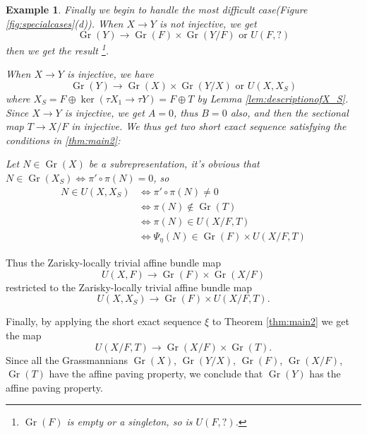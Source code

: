 \documentclass[reqno,11pt]{amsart}
\numberwithin{equation}{section}
\theoremstyle{plain}
\newtheorem{eg}[theorem]{Example}
\theoremstyle{plain}
\numberwithin{equation}{section}
\theoremstyle{remark}
\newcommand{\Gr}{\operatorname{Gr}}
\begin{document}
\begin{eg}
Finally we begin to handle the most difficult case(Figure \ref{fig:specialcases}(d)). When $X \longrightarrow Y$ is not injective, we get
$$\Gr(Y) \longrightarrow \Gr(F) \times \Gr(Y/F) \text{ or } U(F,?)$$
then we get the result \footnote{$\Gr(F)$ is empty or a singleton, so is $U(F,?)$.}.

When $X \longrightarrow Y$ is injective, we have
$$\Gr(Y) \longrightarrow \Gr(X) \times \Gr(Y/X) \text{ or } U(X,X_S)$$
where $X_S=F\oplus \ker(\tau X_1 \longrightarrow \tau Y)=F \oplus T$ by Lemma \ref{lem:descriptionofX_S}. Since $X \longrightarrow Y$ is injective, we get $A=0$, thus $B=0$ also, and then the sectional map $T \longrightarrow X/F$ in injective. We thus get two short exact sequence satisfying the conditions in \ref{thm:main2}:
\begin{center}
\end{center}
Let $N \in \Gr(X)$ be a subrepresentation, it's obvious that $N \in \Gr(X_S) \iff \pi'\circ \pi(N)=0$, so 
  \begin{equation*}
  \begin{aligned}
  N\in U(X,X_S) & \iff \pi'\circ \pi(N) \neq 0\\
  & \iff \pi(N) \notin \Gr(T)\\
  & \iff \pi(N) \in U(X/F,T)\\
  & \iff \Psi_{\eta}(N) \in \Gr(F) \times U(X/F,T)
  \end{aligned}
  \end{equation*}
\end{eg}
Thus the Zarisky-locally trivial affine bundle map
$$U(X,F) \longrightarrow \Gr(F) \times \Gr(X/F)$$
restricted to the Zarisky-locally trivial affine bundle map
$$U(X,X_S) \longrightarrow \Gr(F) \times U(X/F,T).$$

Finally, by applying the short exact sequence $\xi$ to Theorem \ref{thm:main2} we get the map
$$U(X/F,T) \longrightarrow \Gr(X/F) \times \Gr(T).$$
Since all the Grassmannians $\Gr(X)$, $\Gr(Y/X)$, $\Gr(F)$, $\Gr(X/F)$, $\Gr(T)$ have the affine paving property, we conclude that $\Gr(Y)$ has the affine paving property.


\end{document}
